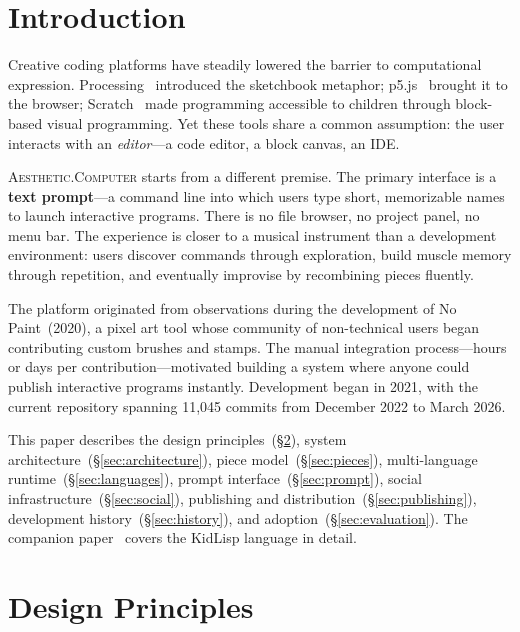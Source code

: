 \documentclass[10pt,letterpaper,twocolumn]{article}
\newcommand{\ac}{\textsc{Aesthetic.Computer}}
\begin{document}

\section{Introduction}

Creative coding platforms have steadily lowered the barrier to computational expression. Processing~\citep{reas2007processing} introduced the sketchbook metaphor; p5.js~\citep{mccarthy2015p5js} brought it to the browser; Scratch~\citep{resnick2009scratch} made programming accessible to children through block-based visual programming. Yet these tools share a common assumption: the user interacts with an \emph{editor}---a code editor, a block canvas, an IDE.

\ac{} starts from a different premise. The primary interface is a \textbf{text prompt}---a command line into which users type short, memorizable names to launch interactive programs. There is no file browser, no project panel, no menu bar. The experience is closer to a musical instrument than a development environment: users discover commands through exploration, build muscle memory through repetition, and eventually improvise by recombining pieces fluently.

The platform originated from observations during the development of No Paint~(2020), a pixel art tool whose community of non-technical users began contributing custom brushes and stamps. The manual integration process---hours or days per contribution---motivated building a system where anyone could publish interactive programs instantly. Development began in 2021, with the current repository spanning 11,045 commits from December 2022 to March 2026.

This paper describes the design principles~(\S\ref{sec:principles}), system architecture~(\S\ref{sec:architecture}), piece model~(\S\ref{sec:pieces}), multi-language runtime~(\S\ref{sec:languages}), prompt interface~(\S\ref{sec:prompt}), social infrastructure~(\S\ref{sec:social}), publishing and distribution~(\S\ref{sec:publishing}), development history~(\S\ref{sec:history}), and adoption~(\S\ref{sec:evaluation}). The companion paper~\citep{scudder2026kidlisp} covers the KidLisp language in detail.


\section{Design Principles}
\label{sec:principles}
\end{document}
